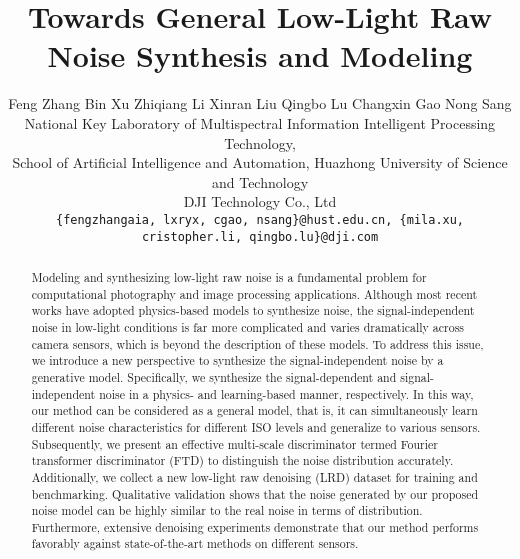\documentclass[10pt,twocolumn,letterpaper]{article}
\begin{document}
\title{Towards General Low-Light Raw Noise Synthesis and Modeling}

\author{
   \hspace{-0.4cm} Feng Zhang
     \hspace{0.01cm} 
    Bin Xu
     \hspace{0.01cm} 
    Zhiqiang Li
     \hspace{0.01cm} 
    Xinran Liu 
     \hspace{0.01cm}
    Qingbo Lu 
     \hspace{0.01cm}
    Changxin Gao
    \hspace{0.01cm}
    Nong Sang\\
National Key Laboratory of Multispectral Information Intelligent Processing Technology,\\ School of Artificial Intelligence and Automation, Huazhong University of Science and Technology\\
DJI Technology Co., Ltd \\
{\tt\small\{fengzhangaia, lxryx, cgao, nsang\}@hust.edu.cn,
\{mila.xu, cristopher.li, qingbo.lu\}@dji.com}
}

\maketitle
\let\thefootnote\relax{}
\ificcvfinal\thispagestyle{empty}\fi


\begin{abstract}
Modeling and synthesizing low-light raw noise is a fundamental problem for computational photography and image processing applications. Although most recent works have adopted physics-based models to synthesize noise, the signal-independent noise in low-light conditions is far more complicated and varies dramatically across camera sensors, which is beyond the description of these models. To address this issue, we introduce a new perspective to synthesize the signal-independent noise by a generative model. Specifically, we synthesize the signal-dependent and signal-independent noise in a physics- and learning-based manner, respectively. In this way, our method can be considered as a general model, that is, it can simultaneously learn different noise characteristics for different ISO levels and generalize to various sensors. Subsequently, we present an effective multi-scale discriminator termed Fourier transformer discriminator (FTD) to distinguish the noise distribution accurately. Additionally, we collect a new low-light raw denoising (LRD) dataset for training and benchmarking. Qualitative validation shows that the noise generated by our proposed noise model can be highly similar to the real noise in terms of distribution. Furthermore, extensive denoising experiments demonstrate that our method performs favorably against state-of-the-art methods on different sensors.
\end{abstract}
\end{document}
